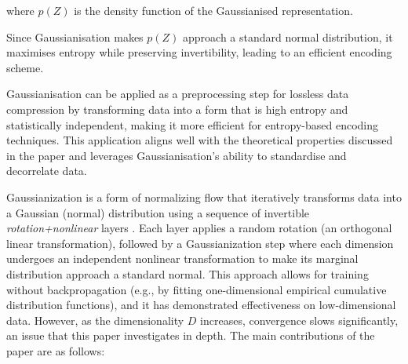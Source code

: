 \noindent where $p(Z)$ is the density function of the Gaussianised representation.

Since Gaussianisation makes $p(Z)$ approach a standard normal distribution, it maximises entropy while preserving invertibility, leading to an efficient encoding scheme.

Gaussianisation can be applied as a preprocessing step for lossless data compression by transforming data into a form that is high entropy and statistically independent, making it more efficient for entropy-based encoding techniques. This application aligns well with the theoretical properties discussed in the paper and leverages Gaussianisation’s ability to standardise and decorrelate data.


Gaussianization is a form of normalizing flow that iteratively transforms data into a Gaussian (normal) distribution using a sequence of invertible \textit{rotation+nonlinear} layers \cite{draxler2023convergence}. Each layer applies a random rotation (an orthogonal linear transformation), followed by a Gaussianization step where each dimension undergoes an independent nonlinear transformation to make its marginal distribution approach a standard normal. This approach allows for training without backpropagation (e.g., by fitting one-dimensional empirical cumulative distribution functions), and it has demonstrated effectiveness on low-dimensional data. However, as the dimensionality $D$ increases, convergence slows significantly, an issue that this paper investigates in depth. The main contributions of the paper are as follows:

